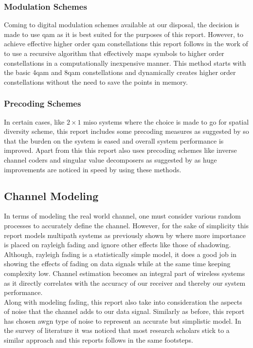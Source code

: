 \subsubsection{Modulation Schemes}
Coming to digital modulation schemes available at our disposal, the decision is made to use \acrshort{qam} as it is best suited for the purposes of this report. However, to achieve effective higher order \acrshort{qam} constellations this report follows in the work of \textcite{Bellili2015} to use a recursive algorithm that effectively maps symbols to higher order constellations in a computationally inexpensive manner. This method starts with the basic 4\acrshort{qam} and 8\acrshort{qam} constellations and dynamically creates higher order constellations without the need to save the points in memory.

\subsubsection{Precoding Schemes}
In certain cases, like $2 \times 1$ \acrshort{miso} systems where the choice is made to go for \gls{spatial diversity} scheme, this report includes some precoding measures as suggested by \textcite{Alamouti1998} so that the burden on the system is eased and overall system performance is improved. Apart from this this report also uses precoding schemes like inverse channel coders and singular value decomposers as suggested by \textcite{Klema1980} as huge improvements are noticed in speed by using these methods.

\subsection{Channel Modeling}
In terms of modeling the real world channel, one must consider various random processes to accurately define the channel. However, for the sake of simplicity this report models multipath systems as previously shown by \textcite{Hanlen2006} where more importance is placed on \gls{rayleigh fading} and ignore other effects like those of shadowing. Although, \gls{rayleigh fading} is a statistically simple model, it does a good job in showing the effects of fading on data signals while at the same time keeping complexity low. Channel estimation becomes an integral part of wireless systems as it directly correlates with the accuracy of our receiver and thereby our system performance.\\
Along with modeling fading, this report also take into consideration the aspects of noise that the channel adds to our data signal. Similarly as before, this report has chosen \acrshort{awgn} type of noise to represent an accurate but simplistic model. In the survey of literature it was noticed that most research scholars stick to a similar approach and this reports follows in the same footsteps.


